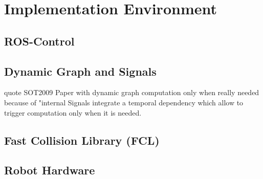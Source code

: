 \chapter{Implementation Environment}
\label{chapter:implenv}

\section{ROS-Control}
\section{Dynamic Graph and Signals}
quote SOT2009 Paper with dynamic graph computation only when really needed because of "internal Signals
integrate a temporal dependency which allow to trigger
computation only when it is needed. 
\section{Fast Collision Library (FCL)}
\section{Robot Hardware}


